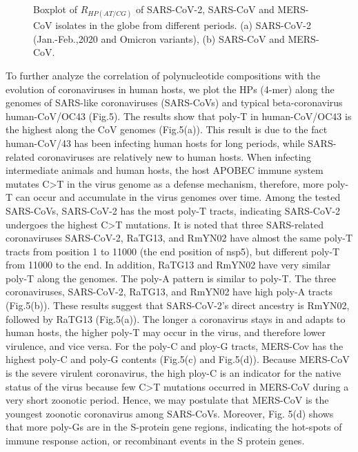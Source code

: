 \documentclass{article}
\numberwithin{equation}{section}
\begin{document}
\begin{figure}[tbp]
	\centering
	\quad
	\caption{Boxplot of $R_{HP(AT/CG)}$ of SARS-CoV-2, SARS-CoV and MERS-CoV isolates in the globe from different periods. (a) SARS-CoV-2 (Jan.-Feb.,2020 and Omicron variants), (b) SARS-CoV and MERS-CoV.}
	\label{fig:sub1}
\end{figure}

To further analyze the correlation of polynucleotide compositions with the evolution of coronaviruses in human hosts, we plot the HPs (4-mer) along the genomes of SARS-like coronaviruses (SARS-CoVs) and typical beta-coronavirus human-CoV/OC43 (Fig.5). The results show that poly-T in human-CoV/OC43 is the highest along the CoV genomes (Fig.5(a)). This result is due to the fact human-CoV/43 has been infecting human hosts for long periods, while SARS-related coronaviruses are relatively new to human hosts. When infecting intermediate animals and human hosts, the host APOBEC immune system mutates C>T in the virus genome as a defense mechanism, therefore, more poly-T can occur and accumulate in the virus genomes over time. Among the tested SARS-CoVs, SARS-CoV-2 has the most poly-T tracts, indicating SARS-CoV-2 undergoes the highest C>T mutations. It is noted that three SARS-related coronaviruses SARS-CoV-2, RaTG13, and RmYN02 have almost the same poly-T tracts from position 1 to 11000 (the end position of nsp5), but different poly-T from 11000 to the end. In addition, RaTG13 and RmYN02 have very similar poly-T along the genomes. The poly-A pattern is similar to poly-T. The three coronaviruses, SARS-CoV-2, RaTG13, and RmYN02 have high poly-A tracts (Fig.5(b)). These results suggest that SARS-CoV-2's direct ancestry is RmYN02, followed by RaTG13 (Fig.5(a)). The longer a coronavirus stays in and adapts to human hosts, the higher poly-T may occur in the virus, and therefore lower virulence, and vice versa. For the poly-C and ploy-G tracts, MERS-Cov has the highest poly-C and poly-G contents (Fig.5(c) and Fig.5(d)). Because MERS-CoV is the severe virulent coronavirus, the high ploy-C is an indicator for the native status of the virus because few C>T mutations occurred in MERS-CoV during a very short zoonotic period. Hence, we may postulate that MERS-CoV is the youngest zoonotic coronavirus among SARS-CoVs. Moreover, Fig. 5(d) shows that more poly-Gs are in the S-protein gene regions, indicating the hot-spots of immune response action, or recombinant events in the S protein genes. 
\end{document}
